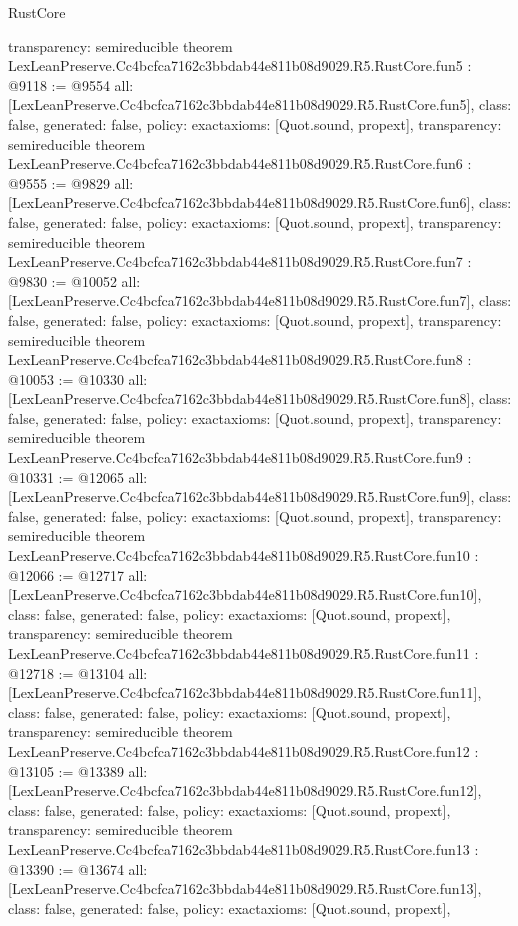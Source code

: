 \begin{lexlean}{RustCore}
\begin{coremodule}
{  transparency: semireducible
}
theorem LexLeanPreserve.Cc4bcfca7162c3bbdab44e811b08d9029.R5.RustCore.fun5 : @9118 := @9554 {
  all: [LexLeanPreserve.Cc4bcfca7162c3bbdab44e811b08d9029.R5.RustCore.fun5],
  class: false,
  generated: false,
  policy: exact{axioms: [Quot.sound, propext]},
  transparency: semireducible
}
theorem LexLeanPreserve.Cc4bcfca7162c3bbdab44e811b08d9029.R5.RustCore.fun6 : @9555 := @9829 {
  all: [LexLeanPreserve.Cc4bcfca7162c3bbdab44e811b08d9029.R5.RustCore.fun6],
  class: false,
  generated: false,
  policy: exact{axioms: [Quot.sound, propext]},
  transparency: semireducible
}
theorem LexLeanPreserve.Cc4bcfca7162c3bbdab44e811b08d9029.R5.RustCore.fun7 : @9830 := @10052 {
  all: [LexLeanPreserve.Cc4bcfca7162c3bbdab44e811b08d9029.R5.RustCore.fun7],
  class: false,
  generated: false,
  policy: exact{axioms: [Quot.sound, propext]},
  transparency: semireducible
}
theorem LexLeanPreserve.Cc4bcfca7162c3bbdab44e811b08d9029.R5.RustCore.fun8 : @10053 := @10330 {
  all: [LexLeanPreserve.Cc4bcfca7162c3bbdab44e811b08d9029.R5.RustCore.fun8],
  class: false,
  generated: false,
  policy: exact{axioms: [Quot.sound, propext]},
  transparency: semireducible
}
theorem LexLeanPreserve.Cc4bcfca7162c3bbdab44e811b08d9029.R5.RustCore.fun9 : @10331 := @12065 {
  all: [LexLeanPreserve.Cc4bcfca7162c3bbdab44e811b08d9029.R5.RustCore.fun9],
  class: false,
  generated: false,
  policy: exact{axioms: [Quot.sound, propext]},
  transparency: semireducible
}
theorem LexLeanPreserve.Cc4bcfca7162c3bbdab44e811b08d9029.R5.RustCore.fun10 : @12066 := @12717 {
  all: [LexLeanPreserve.Cc4bcfca7162c3bbdab44e811b08d9029.R5.RustCore.fun10],
  class: false,
  generated: false,
  policy: exact{axioms: [Quot.sound, propext]},
  transparency: semireducible
}
theorem LexLeanPreserve.Cc4bcfca7162c3bbdab44e811b08d9029.R5.RustCore.fun11 : @12718 := @13104 {
  all: [LexLeanPreserve.Cc4bcfca7162c3bbdab44e811b08d9029.R5.RustCore.fun11],
  class: false,
  generated: false,
  policy: exact{axioms: [Quot.sound, propext]},
  transparency: semireducible
}
theorem LexLeanPreserve.Cc4bcfca7162c3bbdab44e811b08d9029.R5.RustCore.fun12 : @13105 := @13389 {
  all: [LexLeanPreserve.Cc4bcfca7162c3bbdab44e811b08d9029.R5.RustCore.fun12],
  class: false,
  generated: false,
  policy: exact{axioms: [Quot.sound, propext]},
  transparency: semireducible
}
theorem LexLeanPreserve.Cc4bcfca7162c3bbdab44e811b08d9029.R5.RustCore.fun13 : @13390 := @13674 {
  all: [LexLeanPreserve.Cc4bcfca7162c3bbdab44e811b08d9029.R5.RustCore.fun13],
  class: false,
  generated: false,
  policy: exact{axioms: [Quot.sound, propext]},
}
\end{coremodule}
\end{lexlean}
